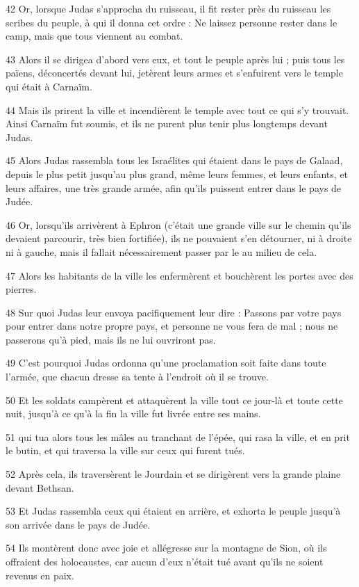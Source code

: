 \par 42 Or, lorsque Judas s'approcha du ruisseau, il fit rester près du ruisseau les scribes du peuple, à qui il donna cet ordre : Ne laissez personne rester dans le camp, mais que tous viennent au combat.
\par 43 Alors il se dirigea d'abord vers eux, et tout le peuple après lui ; puis tous les païens, déconcertés devant lui, jetèrent leurs armes et s'enfuirent vers le temple qui était à Carnaïm.
\par 44 Mais ils prirent la ville et incendièrent le temple avec tout ce qui s'y trouvait. Ainsi Carnaïm fut soumis, et ils ne purent plus tenir plus longtemps devant Judas.
\par 45 Alors Judas rassembla tous les Israélites qui étaient dans le pays de Galaad, depuis le plus petit jusqu'au plus grand, même leurs femmes, et leurs enfants, et leurs affaires, une très grande armée, afin qu'ils puissent entrer dans le pays de Judée.
\par 46 Or, lorsqu'ils arrivèrent à Ephron (c'était une grande ville sur le chemin qu'ils devaient parcourir, très bien fortifiée), ils ne pouvaient s'en détourner, ni à droite ni à gauche, mais il fallait nécessairement passer par le au milieu de cela.
\par 47 Alors les habitants de la ville les enfermèrent et bouchèrent les portes avec des pierres.
\par 48 Sur quoi Judas leur envoya pacifiquement leur dire : Passons par votre pays pour entrer dans notre propre pays, et personne ne vous fera de mal ; nous ne passerons qu'à pied, mais ils ne lui ouvriront pas.
\par 49 C'est pourquoi Judas ordonna qu'une proclamation soit faite dans toute l'armée, que chacun dresse sa tente à l'endroit où il se trouve.
\par 50 Et les soldats campèrent et attaquèrent la ville tout ce jour-là et toute cette nuit, jusqu'à ce qu'à la fin la ville fut livrée entre ses mains.
\par 51 qui tua alors tous les mâles au tranchant de l'épée, qui rasa la ville, et en prit le butin, et qui traversa la ville sur ceux qui furent tués.
\par 52 Après cela, ils traversèrent le Jourdain et se dirigèrent vers la grande plaine devant Bethsan.
\par 53 Et Judas rassembla ceux qui étaient en arrière, et exhorta le peuple jusqu'à son arrivée dans le pays de Judée.
\par 54 Ils montèrent donc avec joie et allégresse sur la montagne de Sion, où ils offraient des holocaustes, car aucun d'eux n'était tué avant qu'ils ne soient revenus en paix.
